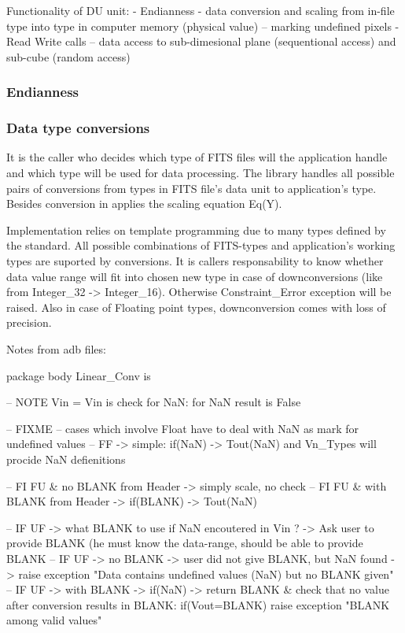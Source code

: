 \documentclass[a4paper,10pt]{article}
\begin{document}
Functionality of DU unit: 
- Endianness
- data conversion and scaling from in-file type into type in computer memory (physical value)
-- marking undefined pixels
- Read Write calls
-- data access to sub-dimesional plane (sequentional access) and sub-cube (random access)


\subsubsection{Endianness}

\subsubsection{Data type conversions}

It is the caller who decides which type of FITS files will the application handle and
which type will be used for data processing. The library handles all possible pairs of
conversions from types in FITS file's data unit to application's type.
Besides conversion in applies the scaling equation Eq(Y).

Implementation relies on template programming due to many types defined by the standard. 
All possible combinations of FITS-types and application's working types are suported
by conversions. It is callers responsability to know whether data value range will fit
into chosen new type in case of downconversions (like from Integer\_32 -> Integer\_16).
Otherwise Constraint\_Error exception will be raised.
Also in case of Floating point types, downconversion comes with loss of precision.

Notes from adb files:

package body Linear_Conv is

-- NOTE Vin = Vin is check for NaN: for NaN result is False

-- FIXME
    -- cases which involve Float have to deal with NaN as mark for undefined values
    -- FF -> simple: if(NaN) -> Tout(NaN) and Vn_Types will procide NaN defienitions

    -- FI FU & no   BLANK from Header -> simply scale, no check
    -- FI FU & with BLANK from Header -> if(BLANK) -> Tout(NaN)

    -- IF UF -> what BLANK to use if NaN encoutered in Vin ? -> Ask user to provide BLANK (he must know the data-range, should be able to provide BLANK
    -- IF UF -> no   BLANK -> user did not give BLANK, but NaN found -> raise exception "Data contains undefined values (NaN) but no BLANK given"
    -- IF UF -> with BLANK -> if(NaN) -> return BLANK & check that no value after conversion results in BLANK: if(Vout=BLANK) raise exception "BLANK among valid values"
\end{document}
